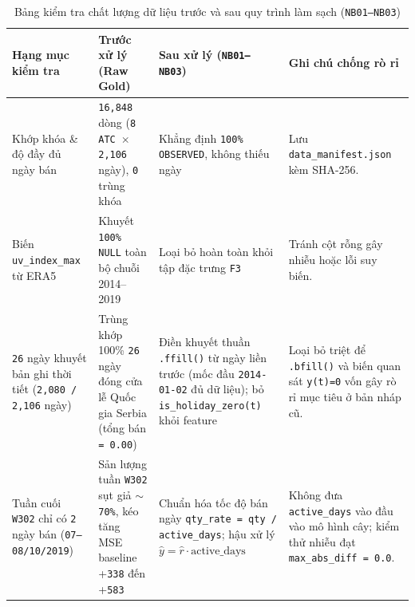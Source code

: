\begin{table}[H]
\centering
\caption{Bảng kiểm tra chất lượng dữ liệu trước và sau quy trình làm sạch (\texttt{NB01--NB03})}
\label{tab:dq_before_after}
\renewcommand{\arraystretch}{1.22}
\begin{tabularx}{\textwidth}{|p{}|p{}|p{}|X|}
\hline
\textbf{Hạng mục kiểm tra} & \textbf{Trước xử lý (Raw Gold)} & \textbf{Sau xử lý (\texttt{NB01--NB03})} & \textbf{Ghi chú chống rò rỉ} \\
\hline
Khớp khóa \& độ đầy đủ ngày bán & \texttt{16,848} dòng (\texttt{8 ATC $\times$ 2,106} ngày), \texttt{0} trùng khóa & Khẳng định \texttt{100\% OBSERVED}, không thiếu ngày & Lưu \texttt{data\_manifest.json} kèm SHA-256. \\
\hline
Biến \texttt{uv\_index\_max} từ ERA5 & Khuyết \texttt{100\% NULL} toàn bộ chuỗi 2014--2019 & Loại bỏ hoàn toàn khỏi tập đặc trưng \texttt{F3} & Tránh cột rỗng gây nhiễu hoặc lỗi suy biến. \\
\hline
\texttt{26} ngày khuyết bản ghi thời tiết (\texttt{2,080 / 2,106} ngày) & Trùng khớp 100\% \texttt{26} ngày đóng cửa lễ Quốc gia Serbia (tổng bán \texttt{= 0.00}) & Điền khuyết thuần \texttt{.ffill()} từ ngày liền trước (mốc đầu \texttt{2014-01-02} đủ dữ liệu); bỏ \texttt{is\_holiday\_zero(t)} khỏi feature & Loại bỏ triệt để \texttt{.bfill()} và biến quan sát \texttt{y(t)=0} vốn gây rò rỉ mục tiêu ở bản nháp cũ. \\
\hline
Tuần cuối \texttt{W302} chỉ có \texttt{2} ngày bán (\texttt{07--08/10/2019}) & Sản lượng tuần \texttt{W302} sụt giả \texttt{$\sim$70\%}, kéo tăng MSE baseline +\texttt{338} đến +\texttt{583} & Chuẩn hóa tốc độ bán ngày \texttt{qty\_rate = qty / active\_days}; hậu xử lý $\hat{y} = \hat{r} \cdot \text{active\_days}$ & Không đưa \texttt{active\_days} vào đầu vào mô hình cây; kiểm thử nhiễu đạt \texttt{max\_abs\_diff = 0.0}. \\
\hline
\end{tabularx}
\end{table}

